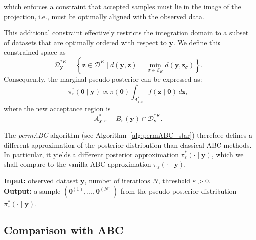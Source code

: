 \documentclass[lineno]{biometrika}
\DeclareMathOperator*{\argmin}{arg\,min}
\def\dataspace{\mathcal{D}}
\def\obsdata{\mathbf{y}}
\def\param{\boldsymbol{\theta}}
\def\parprop{\boldsymbol{\theta}}
\def\simdata{\mathbf{z}}
\def\eps{\varepsilon}
\begin{document}
\noindent which enforces a constraint that accepted samples must lie in the image of the projection, i.e., must be optimally aligned with the observed data.

This additional constraint effectively restricts the integration domain to a subset of datasets that are optimally ordered with respect to \( \obsdata \). We define this constrained space as
\[
\dataspace_{\obsdata}^{*K} = \left\{ \simdata \in \dataspace^K \mid d(\obsdata, \simdata) = \min_{\sigma \in \mathcal{S}_K} d(\obsdata, \simdata_{\sigma}) \right\}.
\]
Consequently, the marginal pseudo-posterior can be expressed as:
\begin{equation}
\label{eqpermabc_star}
\pi_{\varepsilon}^*(\param \mid \obsdata) \propto \pi(\param) \int_{A_{\obsdata,\varepsilon}^*} f(\simdata \mid \param) \, d\simdata,
\end{equation}
where the new acceptance region is 
\[
A_{\obsdata,\varepsilon}^* = B_{\varepsilon}(\obsdata) \cap \dataspace_{\obsdata}^{*K}.
\]

The \emph{permABC} algorithm (see Algorithm~\ref{alg:permABC_star}) therefore defines a different approximation of the posterior distribution than classical ABC methods. In particular, it yields a different posterior approximation  \( \pi_{\varepsilon}^*(\cdot \mid \obsdata) \), which we shall compare to the vanilla ABC approximation \( \pi_{\varepsilon}(\cdot \mid \obsdata) \).


\begin{algorithm}
\caption{permABC Vanilla}\label{alg:permABC_star}
\textbf{Input: }observed dataset $\obsdata$, number of iterations $N$, threshold $\varepsilon>0$.\\
\textbf{Output: }a sample $(\param^{(1)}, \dots, \param^{(N)})$ from the pseudo-posterior distribution $\pi_{\varepsilon}^*(\cdot\mid \obsdata)$.\\

\BlankLine

\For{$i = 1,\dots, N$}{
    \Repeat{$d(\obsdata, \simdata_{\sigma^*}) \leq \eps$}{
        $\parprop \sim \pi(\cdot)$\;
        $\simdata \sim f(\cdot \mid \parprop)$\;
        $\sigma^* = \argmin_{\sigma \in \mathcal{S}_K} d(\obsdata, \simdata_{\sigma})$\;
    }
    $\param^{(i)} = \param'_{\sigma^*}\;$
}
\end{algorithm}

\subsection{Comparison with ABC}
\label{sec:comparison}
\end{document}
